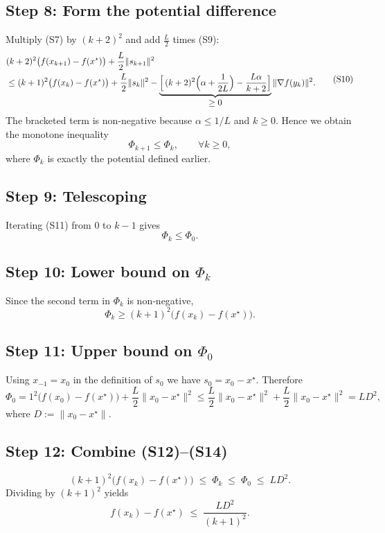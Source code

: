 \documentclass[11pt]{article}
\begin{document}
\subsection*{Step 8: Form the potential difference}
Multiply (S7) by $(k+2)^2$ and add $\frac{L}{2}$ times (S9):
\[
\begin{aligned}
&(k+2)^2\bigl(f(x_{k+1})-f(x^\star)\bigr) +\frac{L}{2}\|s_{k+1}\|^2 \\
&\le (k+1)^2\bigl(f(x_k)-f(x^\star)\bigr) +\frac{L}{2}\|s_k\|^2
      -\underbrace{\Bigl[\,(k+2)^2\Bigl(\alpha+\frac{1}{2L}\Bigr)
                -\frac{L\alpha}{k+2}\Bigr]}_{\displaystyle\ge 0}
        \|\nabla f(y_k)\|^2 .
\end{aligned}
\tag{S10}
\]
The bracketed term is non‑negative because $\alpha\le1/L$ and $k\ge0$.
Hence we obtain the monotone inequality
\[
\Phi_{k+1}\le \Phi_k ,\qquad\forall k\ge0,
\tag{S11}
\]
where $\Phi_k$ is exactly the potential defined earlier.

\subsection*{Step 9: Telescoping}
Iterating (S11) from $0$ to $k-1$ gives
\[
\Phi_k \le \Phi_0 .
\tag{S12}
\]

\subsection*{Step 10: Lower bound on $\Phi_k$}
Since the second term in $\Phi_k$ is non‑negative,
\[
\Phi_k \ge (k+1)^2\bigl(f(x_k)-f(x^\star)\bigr).
\tag{S13}
\]

\subsection*{Step 11: Upper bound on $\Phi_0$}
Using $x_{-1}=x_0$ in the definition of $s_0$ we have $s_0 = x_0-x^\star$. Therefore
\[
\Phi_0 = 1^2\bigl(f(x_0)-f(x^\star)\bigr) + \frac{L}{2}\|x_0-x^\star\|^2
       \le \frac{L}{2}\|x_0-x^\star\|^2 + \frac{L}{2}\|x_0-x^\star\|^2
       = L D^2 ,
\tag{S14}
\]
where $D:=\|x_0-x^\star\|$.

\subsection*{Step 12: Combine (S12)–(S14)}
\[
(k+1)^2\bigl(f(x_k)-f(x^\star)\bigr) \;\le\; \Phi_k \;\le\; \Phi_0 \;\le\; L D^2 .
\]
Dividing by $(k+1)^2$ yields
\[
f(x_k)-f(x^\star) \;\le\; \frac{L D^2}{(k+1)^2}.
\tag{S15}
\]
\end{document}
